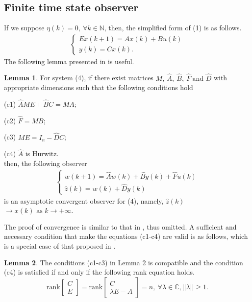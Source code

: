 \documentclass[english]{cccconf}
\theoremstyle{definition}
\newtheorem{lemma}{Lemma}
\begin{document}
\subsection{Finite time state observer}
If we suppose $\eta(k)=0,\ \forall k\in\mathbb{N}$, then, the simplified form of (1) is as follows.
\begin{equation}\begin{split}\begin{cases}
Ex(k+1)=Ax(k)+Bu(k)\\
y(k)=Cx(k).
\end{cases}\end{split}\end{equation}
The following lemma presented in \cite{5573041} is useful.
\begin{lemma} For system (4), if there exist matrices $M,\ \hat{A},\ \hat{B},\ \hat{F}\ \text{and }\hat{D}$ with appropriate dimensions such that the following conditions hold

(c1) $\hat{A}ME+\hat{B}C=MA$;

(c2) $\hat{F}=MB$;

(c3) $ME=I_n-\hat{D}C$;

(c4) $\hat{A}$ is Hurwitz.\\
then, the following observer
\begin{equation}\begin{split}\begin{cases}
w(k+1)=\hat{A}w(k)+\hat{B}y(k)+\hat{F}u(k)\\
\hat{z}(k)=w(k)+\hat{D}y(k)
\end{cases}\end{split}\end{equation}
is an asymptotic convergent observer for (4), namely, $\hat{z}(k)$$\rightarrow x(k) \text{ as } k\rightarrow +\infty$.
\end{lemma}
The proof of convergence is similar to that in \citep{5573041}, thus omitted. A sufficient and necessary condition that make the equations (c1-c4) are valid is as follows, which is a special case of that proposed in \citep{5573041}.
\begin{lemma} The conditions (c1-c3) in Lemma 2 is compatible and the condition (c4) is satisfied if and only if the following rank equation holds.
\begin{equation}
\textrm{rank}\begin{bmatrix}
C\\E
\end{bmatrix}=\textrm{rank}\begin{bmatrix}
C\\\lambda E-A
\end{bmatrix}=n,\ \forall\lambda\in\mathbb{C},||\lambda||\geq 1.
\end{equation}
\end{lemma}
\end{document}
